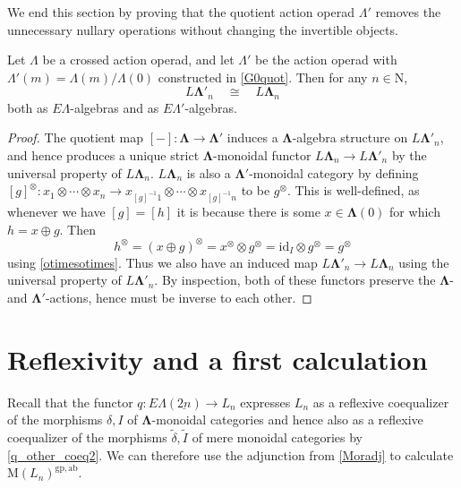 \documentclass{amsbook} %
\newcommand{\id}{\textrm{id}}
\newcommand{\ML}{\mathbf{\Lambda}}
\newcommand{\ELnn}{E\Lambda(\underline{2n})}
\numberwithin{section}{chapter}
\begin{document}
We end this section by proving that the quotient action operad $\Lambda'$ removes the unnecessary nullary operations without changing the invertible objects.

\begin{thm} \label{noscalarcross} Let $\Lambda$ be a crossed action operad, and let $\Lambda'$ be the action operad with $\Lambda'(m) = \Lambda(m)/\Lambda(0)$ constructed in \cref{G0quot}. Then for any $n \in \mathrm{N}$,
\[ L\ML'_n \quad \cong \quad L\ML_n \]
both as $E\Lambda$-algebras and as $E\Lambda'$-algebras.  
\end{thm}
\begin{proof}
The quotient map $[-] \colon \ML \to \ML'$ induces a $\ML$-algebra structure on $L\ML'_n$, and hence produces a unique strict $\ML$-monoidal functor $L\ML_n \to L\ML'_n$ by the universal property of $L\ML_n$. $L\ML_n$ is also a $\ML'$-monoidal category by defining $[g]^{\otimes} \colon x_1 \otimes \cdots \otimes x_n \to x_{[g]^{-1}1} \otimes \cdots \otimes x_{[g]^{-1}n}$ to be $g^{\otimes}$. This is well-defined, as whenever we have $[g] = [h]$ it is because there is some $x \in \ML(0)$ for which $h = x \oplus g$. Then
\[
h^{\otimes} = (x \oplus g)^{\otimes} = x^{\otimes} \otimes g^{\otimes} = \id_I \otimes g^{\otimes} = g^{\otimes}
\]
using \cref{otimesotimes}. Thus we also have an induced map $L\ML'_n \to L\ML_n$ using the universal property of $L\ML'_n$. By inspection, both of these functors preserve the $\ML$- and $\ML'$-actions, hence must be inverse to each other.
\end{proof}

\section{Reflexivity and a first calculation}

Recall that the functor $q \colon  \ELnn \to L_n$ expresses $L_n$ as a reflexive coequalizer of the morphisms $\delta, I$ of $\ML$-monoidal categories and hence also as a reflexive coequalizer of the morphisms $\tilde{\delta}, \tilde{I}$ of mere monoidal categories by \cref{q_other_coeq2}. We can therefore use the adjunction from \cref{Moradj} to calculate $\mathrm{M}(L_{n})^{\mathrm{gp, ab}}$. 
\end{document}
